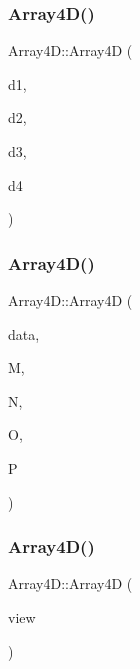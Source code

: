 \mbox{\label{class_array4_d_a2b0e0536b5e40fec5694fdcaebdcff6a}} 
\subsubsection{\texorpdfstring{Array4\+D()}{Array4D()}\hspace{0.1cm}{\footnotesize\ttfamily [3/5]}}
{\footnotesize\ttfamily Array4\+D\+::\+Array4D (\begin{DoxyParamCaption}\item[{size\+\_\+t}]{d1,  }\item[{size\+\_\+t}]{d2,  }\item[{size\+\_\+t}]{d3,  }\item[{size\+\_\+t}]{d4 }\end{DoxyParamCaption})}

\mbox{\label{class_array4_d_a3bdc27c55418d992f2278f54fa8186e5}} 
\subsubsection{\texorpdfstring{Array4\+D()}{Array4D()}\hspace{0.1cm}{\footnotesize\ttfamily [4/5]}}
{\footnotesize\ttfamily Array4\+D\+::\+Array4D (\begin{DoxyParamCaption}\item[{vector$<$ double $>$ const \&}]{data,  }\item[{size\+\_\+t}]{M,  }\item[{size\+\_\+t}]{N,  }\item[{size\+\_\+t}]{O,  }\item[{size\+\_\+t}]{P }\end{DoxyParamCaption})}

\mbox{\label{class_array4_d_a5c5b3aa5f576edefc2e9a61afa87e451}} 
\subsubsection{\texorpdfstring{Array4\+D()}{Array4D()}\hspace{0.1cm}{\footnotesize\ttfamily [5/5]}}
{\footnotesize\ttfamily Array4\+D\+::\+Array4D (\begin{DoxyParamCaption}\item[{Array4\+D\+::array\+\_\+view$<$ 4 $>$\+::type \&}]{view }\end{DoxyParamCaption})}

